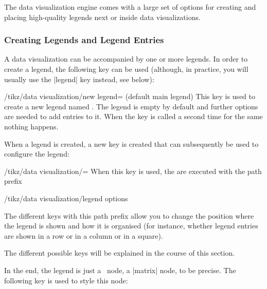 The data visualization engine comes with a large set of options for creating
and placing high-quality legends next or inside data visualizations.


\subsubsection{Creating Legends and Legend Entries}

A data visualization can be accompanied by one or more legends. In order to
create a legend, the following key can be used (although, in practice, you will
usually use the |legend| key instead, see below):

\begin{key}{/tikz/data visualization/new legend= (default main legend)}
    This key is used to create a new legend named . The
    legend is empty by default and further options are needed to add entries to
    it. When the key is called a second time for the same 
    nothing happens.

    When a legend is created, a new key is created that can subsequently be
    used to configure the legend:
    \begin{key}{/tikz/data visualization/=}
        When this key is used, the  are executed with the path
        prefix
\begin{codeexample}
/tikz/data visualization/legend options
\end{codeexample}
        The different keys with this path prefix allow you to change the
        position where the legend is shown and how it is organised (for
        instance, whether legend entries are shown in a row or in a column or
        in a square).

        The different possible keys will be explained in the course of this
        section.
    \end{key}

    In the end, the legend is just a \tikzname\ node, a |matrix| node, to be
    precise. The following key is used to style this node:


\end{key}
